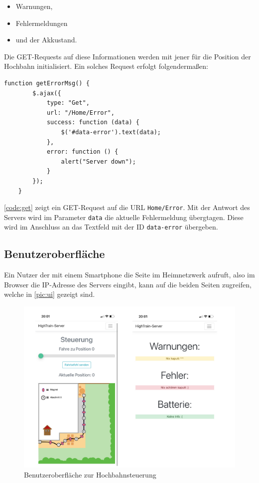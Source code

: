 \begin{center}
	\begin{itemize}
		\item Warnungen,
		\item Fehlermeldungen
		\item und der Akkustand.
	\end{itemize}
\end{center}

Die GET-Requests auf diese Informationen werden mit jener für die Position der Hochbahn initialisiert. Ein solches Request erfolgt folgendermaßen:

\begin{lstlisting}[language=html, style=dhpaperdefault]
	function getErrorMsg() {
		$.ajax({
			type: "Get",
			url: "/Home/Error",
			success: function (data) {
				$('#data-error').text(data);
			},
			error: function () {
				alert("Server down");
			}
		});
    }
\end{lstlisting}
\vspace{0.5cm}
\autoref{code:get} zeigt ein GET-Request auf die URL \texttt{Home/Error}. Mit der Antwort des Servers wird im Parameter \texttt{data} die aktuelle Fehlermeldung übergtagen. Diese wird im Anschluss an das Textfeld mit der ID \texttt{data-error} übergeben. 
\subsection{Benutzeroberfläche}
Ein Nutzer der mit einem Smartphone die Seite im Heimnetzwerk aufruft, also im Browser die IP-Adresse des Servers eingibt, kann auf die beiden Seiten zugreifen, welche in \autoref{pic:ui} gezeigt sind.

\begin{figure}[h]
	\begin{center}
		\includegraphics[width=\textwidth]{UI.pdf}
		\caption{\label{pic:ui}Benutzeroberfläche zur Hochbahnsteuerung}
	\end{center}
\end{figure}

